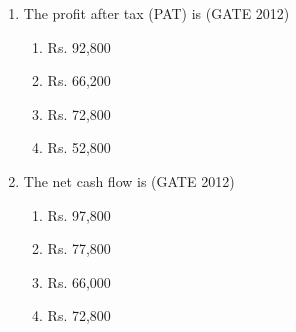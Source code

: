 \documentclass[journal,12pt,onecolumn]{IEEEtran}
\theoremstyle{remark}
\begin{document}
\begin{enumerate}
\textbf{Statement for Linked Answer Questions 54 and 55: }\\
\textbf In a particular year, an organization earns cash revenues of Rs. $2{,}00{,}000$. Total material and labour expenses are Rs. $1{,}09{,}000$. The depreciation claimed on the equipment is Rs. $25{,}000$. The tax rate is $20\%$.

\item The profit after tax (PAT) is  
\hfill{(GATE 2012)}

\begin{enumerate}
\item Rs. 92,800
\item Rs. 66,200
\item Rs. 72,800
\item Rs. 52,800
\end{enumerate}
\vspace{1cm}

\item The net cash flow is  
\hfill{(GATE 2012)}

\begin{enumerate}
\item Rs. 97,800
\item Rs. 77,800
\item Rs. 66,000
\item Rs. 72,800
\end{enumerate}
\vspace{1cm}







\end{enumerate}
\end{document}
